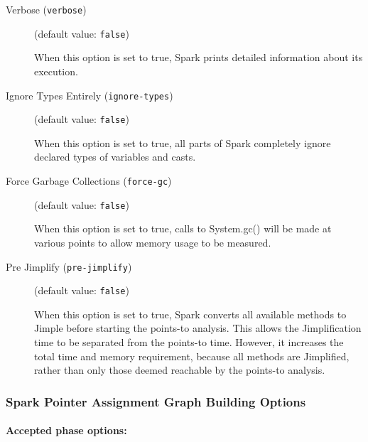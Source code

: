 \documentclass{article}
\begin{document}
\begin{description}

\item[Verbose ({\tt verbose})]
(default value: {\tt false})




When this option is set to true, Spark prints detailed information about its execution.
        


\item[Ignore Types Entirely ({\tt ignore-types})]
(default value: {\tt false})




When this option is set to true, all parts of Spark completely ignore
declared types of variables and casts.
        


\item[Force Garbage Collections ({\tt force-gc})]
(default value: {\tt false})




When this option is set to true, calls to System.gc() will be made at
various points to allow memory usage to be measured.
        


\item[Pre Jimplify ({\tt pre-jimplify})]
(default value: {\tt false})




When this option is set to true, Spark converts all available methods to Jimple
before starting the points-to analysis. This allows the Jimplification
time to be separated from the points-to time. However, it increases the
total time and memory requirement, because all methods are Jimplified,
rather than only those deemed reachable by the points-to analysis.
        


\end{description}

\subsubsection{Spark Pointer Assignment Graph Building Options}


\paragraph{Accepted phase options:} 
\end{document}

